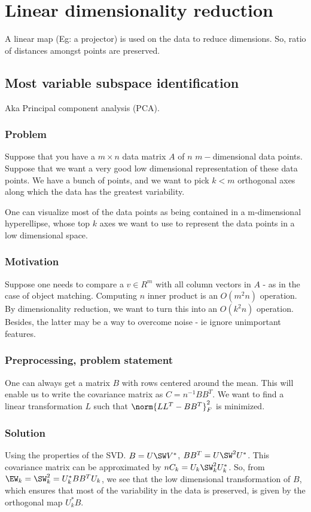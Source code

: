 \documentclass[oneside, article]{memoir}
\begin{document}
\section{Linear dimensionality reduction}
A linear map (Eg: a projector) is used on the data to reduce dimensions. So, ratio of distances amongst points are preserved.

\subsection{Most variable subspace identification}
Aka Principal component analysis (PCA).

\subsubsection{Problem}
Suppose that you have a $m \times n$ data matrix $A$ of $n$ $m-$dimensional data points. Suppose that we want a very good low dimensional representation of these data points. We have a bunch of points, and we want to pick $k < m$ orthogonal axes along which the data has the greatest variability.

One can visualize most of the data points as being contained in a m-dimensional hyperellipse, whose top $k$ axes we want to use to represent the data points in a low dimensional space.

\subsubsection{Motivation}
Suppose one needs to compare a $v \in R^m$ with all column vectors in $A$ - as in the case of object matching. Computing $n$ inner product is an $O(m^2n)$ operation. By dimensionality reduction, we want to turn this into an $O(k^2n)$ operation. Besides, the latter may be a way to overcome noise - ie ignore unimportant features.

\subsubsection{Preprocessing, problem statement}
One can always get a matrix $B$ with rows centered around the mean. This will enable us to write the covariance matrix as $C = n^{-1}BB^{T}$. We want to find a linear transformation $L$ such that $\norm{LL^{T} - BB^{T}}_F^2$ is minimized.

\subsubsection{Solution}
Using the properties of the SVD. $B = U \SW V^{*}$, $BB^{T} = U\SW^{2}U^{*}$. This covariance matrix can be approximated by $nC_k = U_k\SW_k^{2}U_k^{*}$. So, from $\EW_k = \SW_k^{2} = U_k^{*}BB^{T}U_k$, we see that the low dimensional transformation of $B$, which ensures that most of the variability in the data is preserved, is given by the orthogonal map $U_k^{*}B$.
\end{document}
